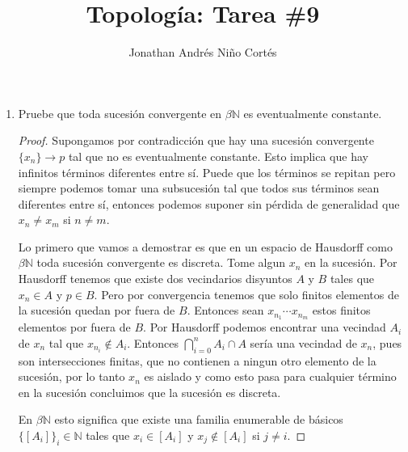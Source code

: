 \documentclass[letter,twoside,12pt]{article}
\title{Topología: Tarea \#9}
\author{Jonathan Andrés Niño Cortés}
\begin{document}
\maketitle

\begin{enumerate}
\item Pruebe que toda sucesión convergente en $ \beta \mathbb{N} $ es eventualmente constante.

\begin{proof}
Supongamos por contradicción que hay una sucesión convergente $ \{x_n\} \to p $ tal que no es eventualmente constante. Esto implica que hay infinitos términos diferentes entre sí. Puede que los términos se repitan pero siempre podemos tomar una subsucesión tal que todos sus términos sean diferentes entre sí, entonces podemos suponer sin pérdida de generalidad que $ x_n \not = x_m $ si $ n \not = m $.



Lo primero que vamos a demostrar es que en un espacio de Hausdorff como $ \beta \mathbb{N} $ toda sucesión convergente es discreta. Tome algun $ x_n $ en la sucesión. Por Hausdorff tenemos que existe dos vecindarios disyuntos $ A $ y $ B $ tales que $ x_n \in A $ y $ p \in B $. Pero por convergencia tenemos que solo finitos elementos de la sucesión quedan por fuera de $ B $. Entonces sean $ x_{n_1} \cdots x_{n_m} $ estos finitos elementos por fuera de $ B $. Por Hausdorff podemos encontrar una vecindad $ A_i $ de $ x_n $ tal que $ x_{n_i} \not \in A_i $. Entonces $ \bigcap_{i=0}^n A_i \cap A $ sería una vecindad de $ x_n $, pues son intersecciones finitas, que no contienen a ningun otro elemento de la sucesión, por lo tanto $ x_n $ es aislado y como esto pasa para cualquier término en la sucesión concluimos que la sucesión es discreta.

En $ \beta\mathbb{N} $ esto significa que existe una familia enumerable de básicos $ \{[A_i]\}_i \in \mathbb{N} $ tales que $ x_i \in [A_i] $ y $ x_j \not \in [A_i] $ si $ j \not = i $.  


\end{proof}
\end{enumerate}
\end{document}
